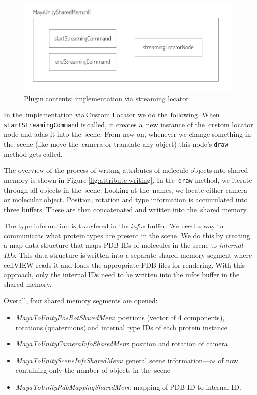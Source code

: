 \documentclass[
  digital, %
  table,   %
  nolof,     %
  nolot,     %
  oneside,
]{fithesis3}
\begin{document}
\begin{figure}
  \centering
  \includegraphics[scale=0.8]{images/plugin-contents.pdf}
  \caption{Plugin contents: implementation via streaming locator}
  \label{fig:plugin-content}
\end{figure}

In the implementation via Custom Locator we do the following. When \texttt{startStreamingCommand} is called, it creates a new instance of the custom locator node and adds it into the scene. From now on, whenever we change something in the scene (like move the camera or translate any object) this node's \texttt{draw} method gets called.

The overview of the process of writing attributes of molecule objects into shared memory is shown in Figure \ref{fig:attribute-writing}. In the \texttt{draw} method, we iterate through all objects in the scene. Looking at the names, we locate either camera or molecular object. Position, rotation and type information is accumulated into three buffers. These are then concatenated and written into the shared memory.

The type information is transfered in the \textit{infos} buffer. We need a way to communicate what protein types are present in the scene. We do this by creating a map data structure that maps PDB IDs of molecules in the scene to \textit{internal IDs}. This data structure is written into a separate shared memory segment where cellVIEW reads it and loads the appropriate PDB files for rendering. With this approach, only the internal IDs need to be written into the infos buffer in the shared memory.

Overall, four shared memory segments are opened:
\begin{itemize}
\item \textit{MayaToUnityPosRotSharedMem}: positions (vector of 4 components), rotations (quaternions) and internal type IDs of each protein instance
\item \textit{MayaToUnityCameraInfoSharedMem}: position and rotation of camera
\item \textit{MayaToUnitySceneInfoSharedMem}: general scene information—as of now containing only the number of objects in the scene
\item \textit{MayaToUnityPdbMappingSharedMem}: mapping of PDB ID to internal ID.
\end{itemize}
\end{document}
